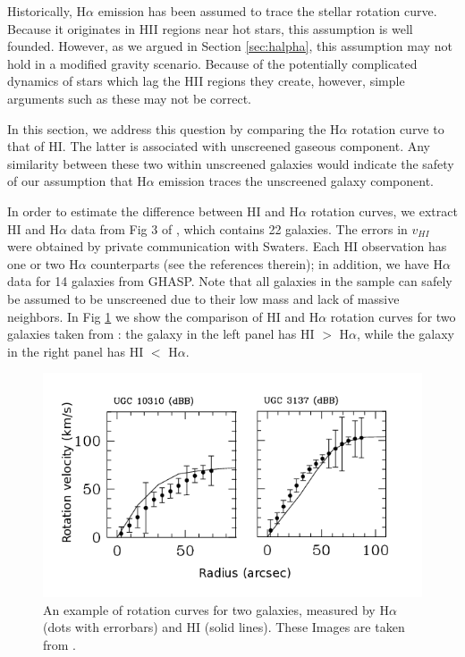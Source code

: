 \documentclass[useAMS,usenatbib,twocolumn]{mn2e}
\newcommand{\ha}{H$\alpha$}
\begin{document}
Historically, \ha{} emission has been assumed to trace the stellar rotation
curve.  Because it originates in HII regions near hot stars, this assumption
is well founded.  However, as we argued in Section \ref{sec:halpha}, this
assumption may not hold in a modified gravity scenario.  Because of the
potentially complicated dynamics of stars which lag the HII regions they
create, however, simple arguments such as these may not be correct.

In this section, we address this question by comparing the \ha{} rotation
curve to that of HI.  The latter is
associated with unscreened gaseous component. Any similarity between
these two within unscreened galaxies would indicate the safety of our
assumption that \ha{} emission traces the unscreened galaxy component.

In order to estimate the difference between HI and \ha{} rotation
curves, we extract HI and \ha{} data from Fig 3 of \citet{Swaters2009}, which
contains 22 galaxies. The errors in $v_{HI}$ were obtained by private
communication with Swaters.  Each HI observation has one or two \ha{}
counterparts (see the references therein); in addition, we have \ha{} data for
14 galaxies from GHASP. Note that all galaxies in the sample can safely be
assumed to be unscreened due
to their low mass and lack of massive neighbors. In Fig \ref{h1-ha-rot-eg} we
show the comparison of HI and \ha{} rotation curves for two galaxies taken from
\citet{Swaters2009}: the galaxy in the left panel has HI $>$ \ha{}, while the
galaxy in the right panel has HI $<$ \ha{}.

\begin{figure}
\begin{center}
  \includegraphics[scale=0.4]{figures/H1-HA-rot-eg.png}
\caption{An example of rotation curves for two galaxies, measured by \ha{}
(dots with errorbars) and HI (solid lines).
These Images are taken from \citet{Swaters2009}.}
\label{h1-ha-rot-eg}
\end{center}
\end{figure}
\end{document}
